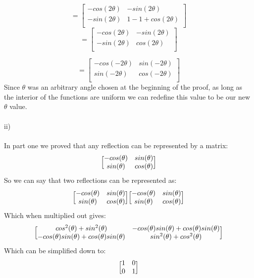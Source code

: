 \documentclass[letterpaper,12pt]{article}
\theoremstyle{definition}
\begin{document}
\[=
\begin{bmatrix}
    -cos(2\theta) & -sin(2\theta) \\
   -sin(2\theta) & 1-1+cos(2\theta) \\
 \end{bmatrix}\]
\[=
\begin{bmatrix}
    -cos(2\theta) & -sin(2\theta) \\
   -sin(2\theta) & cos(2\theta) \\
 \end{bmatrix}\]

 \[=
\begin{bmatrix}
    -cos(-2\theta) & sin(-2\theta) \\
   sin(-2\theta) & cos(-2\theta) \\
 \end{bmatrix}\]
Since $\theta$ was an arbitrary angle chosen at the beginning of the proof, as long as the interior of the functions are uniform we can redefine this value to be our new $\theta$ value.
\\ \\ 
ii) \\ \\
In part one we proved that any reflection can be represented by a matrix:
\[\Big{[}\begin{matrix}
-cos(\theta) & sin(\theta)\\
sin(\theta) & cos(\theta)\\
\end{matrix} \Big{]}
\]
So we can say that two reflections can be represented as:
\[\Big{[}\begin{matrix}
-cos(\theta) & sin(\theta)\\
sin(\theta) & cos(\theta)\\
\end{matrix} \Big{]}
\Big{[}\begin{matrix}
-cos(\theta) & sin(\theta)\\
sin(\theta) & cos(\theta)\\
\end{matrix} \Big{]}\]
Which when multiplied out gives:
\[\Big{[}\begin{matrix}
cos^{2}(\theta)+sin^{2}(\theta) & -cos(\theta)sin(\theta) +cos(\theta)sin(\theta)  \\
-cos(\theta)sin(\theta) +cos(\theta)sin(\theta) & sin^{2}(\theta)+cos^{2}(\theta)  \\
\end{matrix} \Big{]}
\]
Which can be simplified down to:
\[\Big{[}\begin{matrix}
1 & 0\\
0 & 1\\
\end{matrix} \Big{]}
\]
\end{document}
